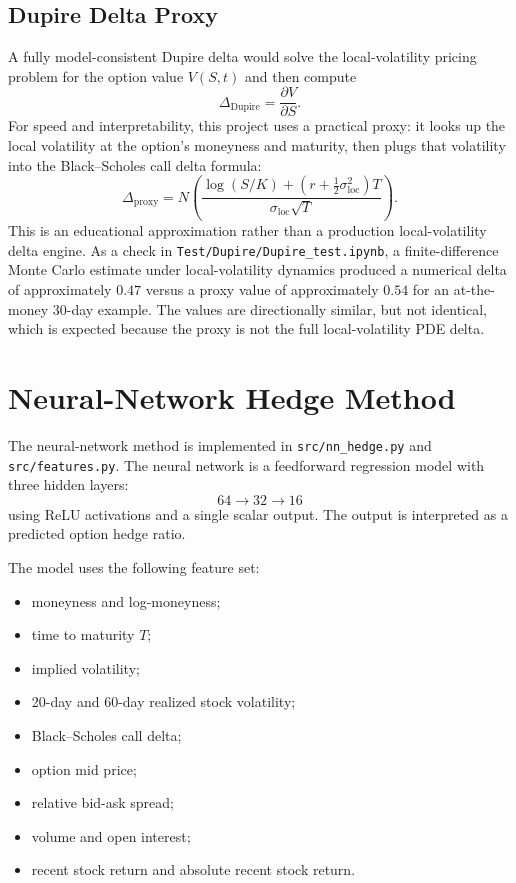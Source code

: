 \documentclass[11pt]{article}
\begin{document}
\subsection*{Dupire Delta Proxy}

A fully model-consistent Dupire delta would solve the local-volatility pricing
problem for the option value $V(S,t)$ and then compute
\[
    \Delta_{\mathrm{Dupire}} = \frac{\partial V}{\partial S}.
\]
For speed and interpretability, this project uses a practical proxy: it looks up
the local volatility at the option's moneyness and maturity, then plugs that
volatility into the Black--Scholes call delta formula:
\[
    \Delta_{\mathrm{proxy}}
    =
    N\!\left(
    \frac{
    \log(S/K) + \left(r+\frac{1}{2}\sigma_{\mathrm{loc}}^2\right)T
    }{
    \sigma_{\mathrm{loc}}\sqrt{T}
    }
    \right).
\]
This is an educational approximation rather than a production local-volatility
delta engine. As a check in \texttt{Test/Dupire/Dupire\_test.ipynb}, a
finite-difference Monte Carlo estimate under local-volatility dynamics produced
a numerical delta of approximately $0.47$ versus a proxy value of approximately
$0.54$ for an at-the-money 30-day example. The values are directionally similar,
but not identical, which is expected because the proxy is not the full
local-volatility PDE delta.

\section*{Neural-Network Hedge Method}

The neural-network method is implemented in \texttt{src/nn\_hedge.py} and
\texttt{src/features.py}. The neural network is a feedforward regression model
with three hidden layers:
\[
    64 \rightarrow 32 \rightarrow 16
\]
using ReLU activations and a single scalar output. The output is interpreted as
a predicted option hedge ratio.

The model uses the following feature set:
\begin{itemize}
    \item moneyness and log-moneyness;
    \item time to maturity $T$;
    \item implied volatility;
    \item 20-day and 60-day realized stock volatility;
    \item Black--Scholes call delta;
    \item option mid price;
    \item relative bid-ask spread;
    \item volume and open interest;
    \item recent stock return and absolute recent stock return.
\end{itemize}
\end{document}
